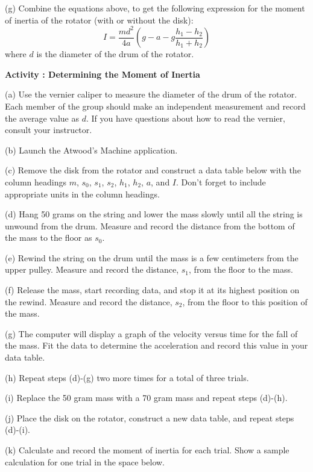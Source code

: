 (g) Combine the equations above, to get the following expression for the moment
of inertia of the rotator (with or without the disk): 
\[
I=\frac{md^{2}}{4a}\left( g-a-g\frac{h_{1}-h_{2}}{h_{1}+h_{2}}\right) \]
where $d$ is the diameter of the drum of the rotator.
\vspace{40mm}

\textbf{Activity  : Determining the Moment of Inertia }

(a) Use the vernier caliper to measure the diameter of the drum of the rotator.
Each member of the group should make an independent measurement and record the
average value as $d$. If you have questions about how to read the vernier, consult
your instructor.
\vspace{10mm}

(b) Launch the Atwood's Machine application.

(c) Remove the disk from the rotator and construct a data table below with the
column headings $m$, \( s_{0} \), \( s_{1} \), \( s_{2} \), \( h_{1} \), 
\( h_{2} \),
$a$, and $I$. Don't forget to include appropriate units in the column headings.
\vspace{100mm}

(d) Hang 50 grams on the string and lower the mass slowly until all the string
is unwound from the drum. Measure and record the distance from the bottom of
the mass to the floor as \( s_{0} \).

(e) Rewind the string on the drum until the mass is a few centimeters from the
upper pulley. Measure and record the distance, \( s_{1} \), from the floor
to the mass.

(f) Release the mass, start recording data, and stop it at its highest position
on the rewind. Measure and record the distance, \( s_{2} \), from the floor
to this position of the mass.

(g) The computer will display a graph of the velocity versus time for the fall
of the mass. Fit the data to determine the acceleration and record this value
in your data table.

(h) Repeat steps (d)-(g) two more times for a total of three trials.

(i) Replace the 50 gram mass with a 70 gram mass and repeat steps (d)-(h).

(j) Place the disk on the rotator, construct a new data table, and repeat steps
(d)-(i).
\vspace{100mm}

(k) Calculate and record the moment of inertia for each trial. Show a sample
calculation for one trial in the space below.
\vspace{30mm}

